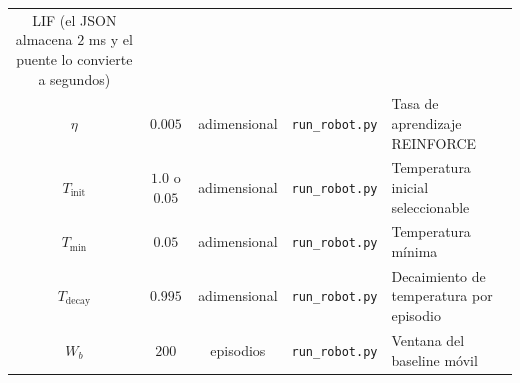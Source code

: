 \begin{table}[H]
\begin{tabularx}{\textwidth}{c c c X X}
LIF (el JSON almacena $2$ ms y el puente lo convierte a segundos) \\
$\eta$ & $0.005$ & adimensional &
\texttt{run\_robot.py} & Tasa de aprendizaje REINFORCE \\
$T_{\mathrm{init}}$ & $1.0$ o $0.05$ & adimensional &
\texttt{run\_robot.py} & Temperatura inicial seleccionable \\
$T_{\min}$ & $0.05$ & adimensional &
\texttt{run\_robot.py} & Temperatura mínima \\
$T_{\mathrm{decay}}$ & $0.995$ & adimensional &
\texttt{run\_robot.py} & Decaimiento de temperatura por episodio \\
$W_b$ & $200$ & episodios &
\texttt{run\_robot.py} & Ventana del baseline móvil \\
\hline
\end{tabularx}
\end{table}